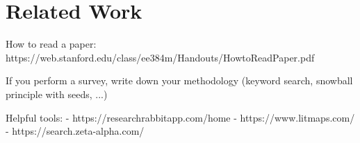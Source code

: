 \section{Related Work}
\label{sec:related_work}

How to read a paper: https://web.stanford.edu/class/ee384m/Handouts/HowtoReadPaper.pdf

If you perform a survey, write down your methodology (keyword search, snowball principle with seeds, ...)

Helpful tools:
- https://researchrabbitapp.com/home
- https://www.litmaps.com/
- https://search.zeta-alpha.com/
